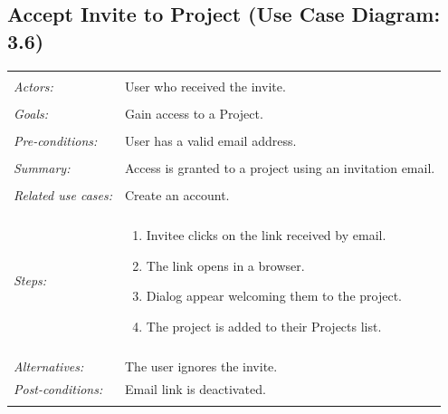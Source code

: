 \documentclass[11pt]{report}
\begin{document}
\subsection{Accept Invite to Project (Use Case Diagram: 3.6)}
\begin{tabular}{ p{2cm} p{12cm} }   
 \hline
 \\
 \textit{Actors:} & User who received the invite. \\
 \\
 \textit{Goals:} & Gain access to a Project. \\
 \\
 \textit{Pre-conditions:} & User has a valid email address. \\
 \\
 \textit{Summary:} & Access is granted to a project using an invitation email. \\ 
 \\
 \textit{Related use cases:} & Create an account. \\
 \\
 \textit{Steps:} & \begin{enumerate}
  \item Invitee clicks on the link received by email.
	 \item The link opens in a browser.
	 \item Dialog appear welcoming them to the project.
	 \item The project is added to their Projects list.
	\end{enumerate} \\
 \\
 \textit{Alternatives:} & The user ignores the invite. \\
 \textit{Post-conditions:} & Email link is deactivated. \\
 \\
\hline
\end{tabular}
\end{document}
